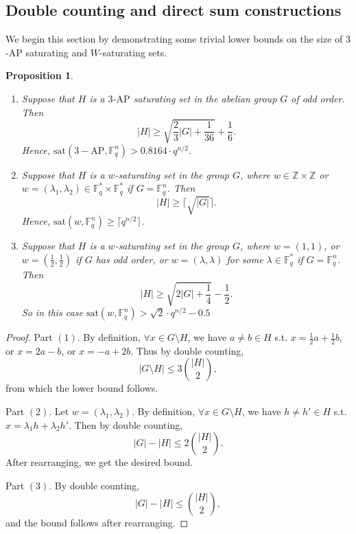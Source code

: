 \documentclass[11pt]{article}
\numberwithin{table}{section}
\newcommand{\F}{{\mathbb F}}
\newcommand{\sat}{\mathrm{sat}}
\newtheorem{prop}[theorem]{\bf Proposition}
\theoremstyle{definition}
\begin{document}
	\subsection{Double counting and direct sum constructions}
	
	
	
	We begin this section by demonstrating some trivial lower bounds on the size of $3$-$\mathrm{AP}$ saturating and $W$-saturating sets.
	
	\begin{prop}
		\label{satbound}
		\begin{enumerate}[\rm(1)]
			
			\item Suppose that $H$ is a $3$-$\mathrm{AP}$ saturating set in the abelian group $G$ of odd order. Then
			\[|H|\geq \sqrt{\frac{2}{3}|G|+\frac{1}{36}}+\frac{1}{6}.\]
			Hence, $\sat(3-\mathrm{AP}, \F_q^n)>0.8164\cdot q^{n/2}$.  \vspace{-0.2cm}
			\item Suppose that $H$ is a $w$-saturating set in the group $G$, where 
			$w\in \mathbb{Z}\times \mathbb{Z}$ %
			or $w=(\lambda_1,\lambda_2)\in \F_q^*\times \F_q^*$  if $G=\F_q^n$. Then 
			\[|H|\geq \lceil \sqrt{|G|} \rceil.\]
			Hence, $\sat(w, \F_q^n)\geq \lceil q^{n/2} \rceil$.  \vspace{-0.2cm}
			\item Suppose that $H$ is a $w$-saturating set in the group $G$, where 
			$w=(1,1)$, or $w=(\frac12, \frac12)$ if $G$ has odd order, or $w=(\lambda,\lambda)$ for some $\lambda \in \F_q^*$ if $G=\F_q^n$. Then
			\[|H|\geq \sqrt{2|G|+\frac14}  -\frac12.\]
			So in this case $\sat(w, \F_q^n)>\sqrt2\cdot q^{n/2}-0.5$
		\end{enumerate}
	\end{prop}
	\begin{proof}
		Part $(1)$. 
		By definition, $\forall x\in G\setminus H$, we have $a\neq b\in H$ s.t.  $x=\frac12 a + \frac12 b$, or $x=2a-b$, or $x=-a+2b$. Thus by double counting, \begin{equation*}\label{eq:1}
			|G\setminus H|\leq 3\binom{|H|}{2},
		\end{equation*}
		from which the lower bound follows.
		
		Part $(2)$.
		Let $w=(\lambda_1, \lambda_2)$. 
		By definition, $\forall x\in G\setminus H$, we have $h\neq h'\in H$ s.t.  $x= \lambda_1h+\lambda_2h'$. 
		Then by double counting, \begin{equation*}\label{eq:11}
			|G|- |H|\leq 2\binom{|H|}{2}.
		\end{equation*}
		After rearranging, we get the desired bound.
		
		Part $(3)$. By double counting,
		\[|G|-|H|\leq \binom{|H|}{2},\]
		and the bound follows after rearranging.
	\end{proof}
	
\end{document}
